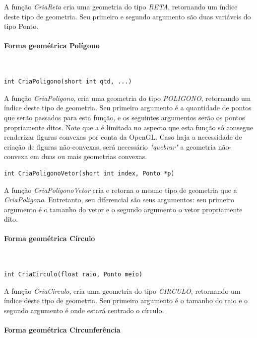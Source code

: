 A função \emph{CriaReta} cria uma geometria do tipo \emph{RETA}, retornando um índice deste tipo de geometria. Seu primeiro e segundo argumento são duas variáveis do tipo Ponto.

\paragraph{Forma geométrica Polígono}\mbox{}\\

 
\begin{lstlisting}
int CriaPoligono(short int qtd, ...)
\end{lstlisting}


A função \emph{CriaPoligono}, cria uma geometria do tipo \emph{POLIGONO}, retornando um índice deste tipo de geometria. Seu primeiro argumento é a quantidade de pontos que serão passados para esta função, e os seguintes argumentos serão os pontos propriamente ditos. Note que a \playAPC{} é limitada no aspecto que esta função só consegue renderizar figuras convexas por conta da OpenGL. Caso haja a necessidade de criação de figuras não-convexas, será necessário \emph{"quebrar"} a geometria não-convexa em duas ou mais geometrias convexas.

 
\begin{lstlisting}
int CriaPoligonoVetor(short int index, Ponto *p)
\end{lstlisting}


A função \emph{CriaPoligonoVetor} cria e retorna o mesmo tipo de geometria que a \emph{CriaPoligono}. Entretanto, seu diferencial são seus argumentos: seu primeiro argumento é o tamanho do vetor e o segundo argumento o vetor propriamente dito.

\paragraph{Forma geométrica Círculo}\mbox{}\\

 
\begin{lstlisting} 
int CriaCirculo(float raio, Ponto meio)
\end{lstlisting}


A função \emph{CriaCirculo}, cria uma geometria do tipo \emph{CIRCULO}, retornando um índice deste tipo de geometria. Seu primeiro argumento é o tamanho do raio e o segundo argumento é onde estará centrado o círculo.

\paragraph{Forma geométrica Circunferência}\mbox{}\\

